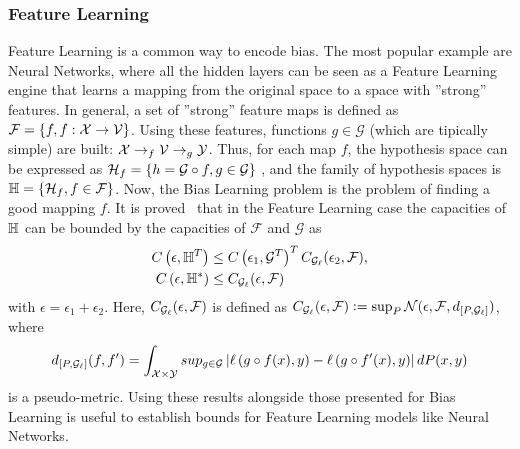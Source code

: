 \subsubsection*{Feature Learning}
Feature Learning is a common way to encode bias. The most popular example are Neural Networks, where all the hidden layers can be seen as a Feature Learning engine that learns a mapping from the original space to a space with ''strong'' features.
In general, a set of ''strong'' feature maps is defined as $\mathcal{F} = \left\{f, f: \mathcal{X} \to \mathcal{V}\right\}$. Using these features, functions $g \in \mathcal{G}$ (which are tipically simple) are built:
$\mathcal{X} \to_f \mathcal{V} \to_g \mathcal{Y}$.
Thus, for each map $f$, the hypothesis space can be expressed as 
$\mathcal{H}_f = \left\{h = \mathcal{G} \circ f, g \in \mathcal{G}\right\}$
, and the family of hypothesis spaces is 
$\mathbb{H} = \left\{\mathcal{H}_f, f \in \mathcal{F}\right\}$.
Now, the Bias Learning problem is the problem of finding a good mapping $f$.
It is proved~\cite[Theorem~6]{baxter2000model} that in the Feature Learning case the capacities of $\mathbb{H}$ can be bounded by the capacities of $\mathcal{F}$ and $\mathcal{G}$ as
\begin{align*}
    C\left(\epsilon, \mathbb{H}^{T}\right) &\leq C\left(\epsilon_1, \mathcal{G}^T\right)^T C_{\mathcal{G}_\ell}(\epsilon_2, \mathcal{F}) , \\
    C\left(\epsilon, \mathbb{H}^{*}\right) &\leq C_{\mathcal{G}_\ell}(\epsilon, \mathcal{F})
\end{align*}
with $\epsilon = \epsilon_1 + \epsilon_2 $. Here, $C_{\mathcal{G}_\ell}(\epsilon, \mathcal{F})$ is defined as 
$C_{\mathcal{G}_\ell}(\epsilon, \mathcal{F}) \vcentcolon= \sup_P \mathcal{N}(\epsilon, \mathcal{F}, d_{[P, \mathcal{G}_\ell]})$, where
$$ d_{[P, \mathcal{G}_\ell]}(f, f') = \int_{\mathcal{X} \times \mathcal{Y}} sup_{g \in \mathcal{G}} \left|\ell\left( g \circ f(x), y\right) - \ell\left( g \circ f'(x), y\right)\right| dP(x, y)$$
is a pseudo-metric. Using these results alongside those presented for Bias Learning is useful to establish bounds for Feature Learning models like Neural Networks.

